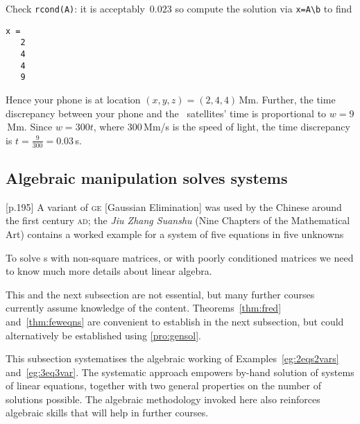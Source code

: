 \begin{example}
\begin{solution}
Check \verb|rcond(A)|: it is acceptably~\(0.023\) so compute the solution via \verb|x=A\b| to find
\setbox\ajrqrbox\hbox{}%
\marginpar{\usebox{\ajrqrbox\\[2ex]}}%
\begin{verbatim}
x =
   2
   4
   4
   9
\end{verbatim}
Hence your phone is at location \((x,y,z)=(2,4,4)\)\,Mm. 
Further, the time discrepancy between your phone and the \gps\ satellites' time is proportional to \(w=9\)\,Mm.
Since \(w=300t\), where \(300\)\,Mm/s is the speed of light, the time discrepancy is \(t=\frac9{300}=0.03\)\,s.
\end{solution}
\end{example}








\subsection{Algebraic manipulation solves systems}
\label{sec:amss}

\begin{quoted}{\cite{Higham1996} [p.195]}
A variant of \textsc{ge} [Gaussian Elimination] was used by the Chinese around the first century \textsc{ad}; the \emph{Jiu Zhang Suanshu} (Nine Chapters of the Mathematical Art) contains a worked example for a system of five equations in five unknowns
\end{quoted}

To solve s with non-square matrices, or with poorly conditioned matrices we need to know much more details about linear algebra.

\begin{aside}
This and the next subsection are not essential, but many further courses currently assume knowledge of the content. 
Theorems~\ref{thm:fred} and~\ref{thm:feweqns} are convenient to establish in the next subsection, but could alternatively be established using \autoref{pro:gensol}. 
\end{aside}
This subsection systematises the algebraic working of Examples~\ref{eg:2eqs2vars} and~\ref{eg:3eq3var}.
The systematic approach empowers by-hand solution of systems of linear equations, together with two general properties on the number of solutions possible.
The algebraic methodology invoked here also reinforces algebraic skills that will help in further courses.

